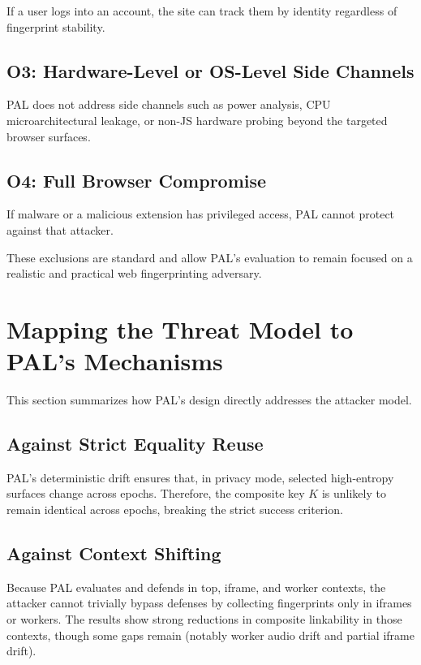 \documentclass[11pt]{report}
\begin{document}
If a user logs into an account, the site can track them by identity regardless of fingerprint stability.

\subsection{O3: Hardware-Level or OS-Level Side Channels}

PAL does not address side channels such as power analysis, CPU microarchitectural leakage, or non-JS hardware probing beyond the targeted browser surfaces.

\subsection{O4: Full Browser Compromise}

If malware or a malicious extension has privileged access, PAL cannot protect against that attacker.

These exclusions are standard and allow PAL’s evaluation to remain focused on a realistic and practical web fingerprinting adversary.

\section{Mapping the Threat Model to PAL’s Mechanisms}

This section summarizes how PAL’s design directly addresses the attacker model.

\subsection{Against Strict Equality Reuse}

PAL’s deterministic drift ensures that, in privacy mode, selected high-entropy surfaces change across epochs. Therefore, the composite key $K$ is unlikely to remain identical across epochs, breaking the strict success criterion.

\subsection{Against Context Shifting}

Because PAL evaluates and defends in top, iframe, and worker contexts, the attacker cannot trivially bypass defenses by collecting fingerprints only in iframes or workers. The results show strong reductions in composite linkability in those contexts, though some gaps remain (notably worker audio drift and partial iframe drift).
\end{document}
